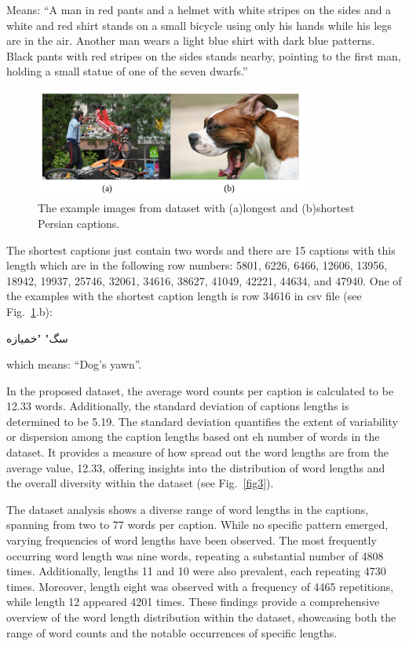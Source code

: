 \documentclass[runningheads]{llncs}
\begin{document}
Means: ``A man in red pants and a helmet with white stripes on the sides and a white and red shirt stands on a small bicycle using only his hands while his legs are in the air. Another man wears a light blue shirt with dark blue patterns. Black pants with red stripes on the sides stands nearby, pointing to the first man, holding a small statue of one of the seven dwarfs.''

\begin{figure}
  \begin{center}
    \includegraphics[width=0.8\textwidth]{long_short.jpg}
    \caption{The example images from dataset with (a)longest and (b)shortest Persian captions.} \label{fig2}
  \end{center}
\end{figure}

The shortest captions just contain two words and there are 15 captions with this length which are in the following row numbers: 5801, 6226, 6466, 12606, 13956, 18942, 19937, 25746, 32061, 34616, 38627, 41049, 42221, 44634, and 47940. One of the examples with the shortest caption length is row 34616 in csv file (see Fig.~\ref{fig2}.b):\begin{farsi}
\arabicfont\small
سگ" "خمیازه\end{farsi}
which means: ``Dog's yawn''.

In the proposed dataset, the average word counts per caption is calculated to be 12.33 words. Additionally, the standard deviation of captions lengths is determined to be 5.19. The standard deviation quantifies the extent of variability or dispersion among the caption lengths based ont eh number of words in the dataset. It provides a measure of how spread out the word lengths are from the average value, 12.33, offering insights into the distribution of word lengths and the overall diversity within the dataset (see Fig.~\ref{fig3}).

The dataset analysis shows a diverse range of word lengths in the captions, spanning from two to 77 words per caption. While no specific pattern emerged, varying frequencies of word lengths have been observed. The most frequently occurring word length was nine words, repeating a substantial number of 4808 times. Additionally, lengths 11 and 10 were also prevalent, each repeating 4730 times. Moreover, length eight was observed with a frequency of 4465 repetitions, while length 12 appeared 4201 times. These findings provide a comprehensive overview of the word length distribution within the dataset, showcasing both the range of word counts and the notable occurrences of specific lengths.
\end{document}
